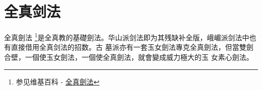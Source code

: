 \chapter{全真剑法}
全真劍法
\footnote{参见维基百科 - \href{http://zh.wikipedia.org/wiki/\%E5\%85\%A8\%E7\%9C\%9F\%E5\%89\%91\%E6\%B3\%95}{全真劍法}}是全真教的基礎劍法。华山派剑法即为其残缺补全版，峨嵋派剑法中也有直接借用全真剑法的招数。古
墓派亦有一套玉女劍法專克全真劍法，但當雙劍合壁，一個使玉女劍法，一個使全真劍法，就會變成威力極大的玉
女素心劍法。

